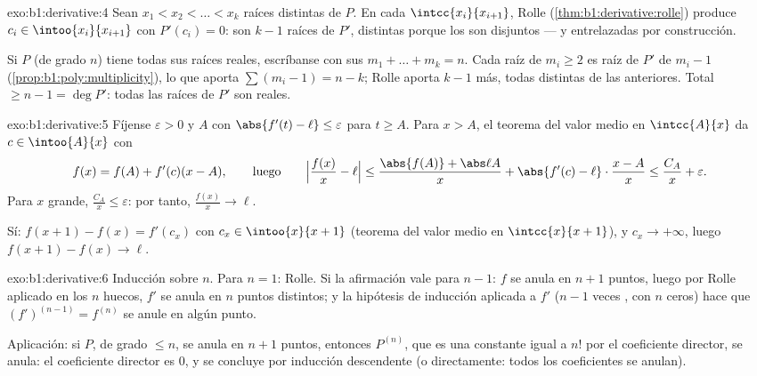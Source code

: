 \begin{solution}{exo:b1:derivative:4}
Sean $x_1 < x_2 < \dots < x_k$ raíces distintas de $P$. En cada
$\intcc{x_i}{x_{i+1}}$, Rolle (\cref{thm:b1:derivative:rolle})
produce $c_i \in \intoo{x_i}{x_{i+1}}$ con $P'(c_i) = 0$: son
$k - 1$ raíces de $P'$, distintas porque los   son
disjuntos --- y entrelazadas por construcción.

Si $P$ (de grado $n$) tiene todas sus raíces reales, escríbanse con
sus  $m_1 + \dots + m_k = n$. Cada raíz de
 $m_i \geq 2$ es raíz de $P'$ de 
$m_i - 1$ (\cref{prop:b1:poly:multiplicity}), lo que aporta
$\sum (m_i - 1) = n - k$; Rolle aporta $k - 1$ más, todas distintas
de las anteriores. Total $\geq n - 1 = \deg P'$: todas las raíces de
$P'$ son reales.
\end{solution}

\begin{solution}{exo:b1:derivative:5}
Fíjense $\varepsilon > 0$ y $A$ con
$\abs{f'(t) - \ell} \leq \varepsilon$ para $t \geq A$. Para $x > A$,
el teorema del valor medio en $\intcc{A}{x}$ da $c \in \intoo{A}{x}$
con
\[
f(x) = f(A) + f'(c)(x - A),
\qquad\text{luego}\qquad
\Bigl|\frac{f(x)}{x} - \ell\Bigr|
\leq \frac{\abs{f(A)} + \abs\ell A}{x} + \abs{f'(c) - \ell}
\cdot\frac{x - A}{x} \leq \frac{C_A}{x} + \varepsilon .
\]
Para $x$ grande, $\frac{C_A}{x} \leq \varepsilon$: por tanto,
$\frac{f(x)}{x} \to \ell$.

Sí: $f(x+1) - f(x) = f'(c_x)$ con $c_x \in \intoo{x}{x+1}$ (teorema
del valor medio en $\intcc{x}{x+1}$), y $c_x \to +\infty$, luego
$f(x+1) - f(x) \to \ell$.
\end{solution}

\begin{solution}{exo:b1:derivative:6}
Inducción sobre $n$. Para $n = 1$: Rolle. Si la afirmación vale para
$n - 1$: $f$ se anula en $n+1$ puntos, luego por Rolle aplicado en
los $n$ huecos, $f'$ se anula en $n$ puntos distintos; y la hipótesis
de inducción aplicada a $f'$ ($n-1$ veces , con $n$ ceros)
hace que $(f')^{(n-1)} = f^{(n)}$ se anule en algún punto.

Aplicación: si $P$, de grado $\leq n$, se anula en $n+1$ puntos,
entonces $P^{(n)}$, que es una constante igual a $n!$ por el
coeficiente director, se anula: el coeficiente director es $0$, y se
concluye por inducción descendente (o directamente: todos los
coeficientes se anulan).
\end{solution}

